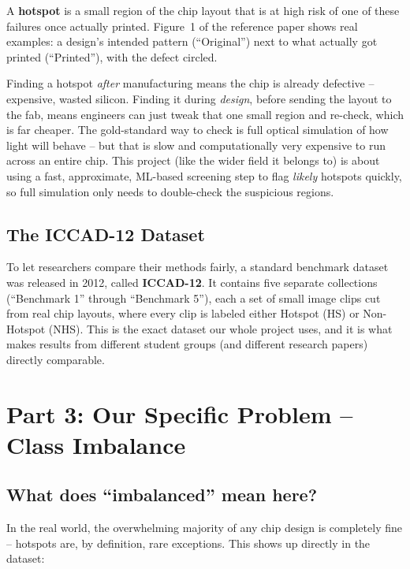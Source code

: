 \documentclass[11pt]{article}
\begin{document}
A \textbf{hotspot} is a small region of the chip layout that is at
high risk of one of these failures once actually printed. Figure~1 of
the reference paper shows real examples: a design's intended pattern
(``Original'') next to what actually got printed (``Printed''), with
the defect circled.

\begin{keyidea}
Finding a hotspot \emph{after} manufacturing means the chip is
already defective -- expensive, wasted silicon. Finding it during
\emph{design}, before sending the layout to the fab, means engineers
can just tweak that one small region and re-check, which is far
cheaper. The gold-standard way to check is full optical simulation of
how light will behave -- but that is slow and computationally very
expensive to run across an entire chip. This project (like the wider
field it belongs to) is about using a fast, approximate, ML-based
screening step to flag \emph{likely} hotspots quickly, so full
simulation only needs to double-check the suspicious regions.
\end{keyidea}

\subsection{The ICCAD-12 Dataset}
To let researchers compare their methods fairly, a standard
benchmark dataset was released in 2012, called \textbf{ICCAD-12}. It
contains five separate collections (``Benchmark 1'' through
``Benchmark 5''), each a set of small image clips cut from real chip
layouts, where every clip is labeled either Hotspot (HS) or
Non-Hotspot (NHS). This is the exact dataset our whole project uses,
and it is what makes results from different student groups (and
different research papers) directly comparable.

\section{Part 3: Our Specific Problem -- Class Imbalance}

\subsection{What does ``imbalanced'' mean here?}
In the real world, the overwhelming majority of any chip design is
completely fine -- hotspots are, by definition, rare exceptions. This
shows up directly in the dataset:
\end{document}
